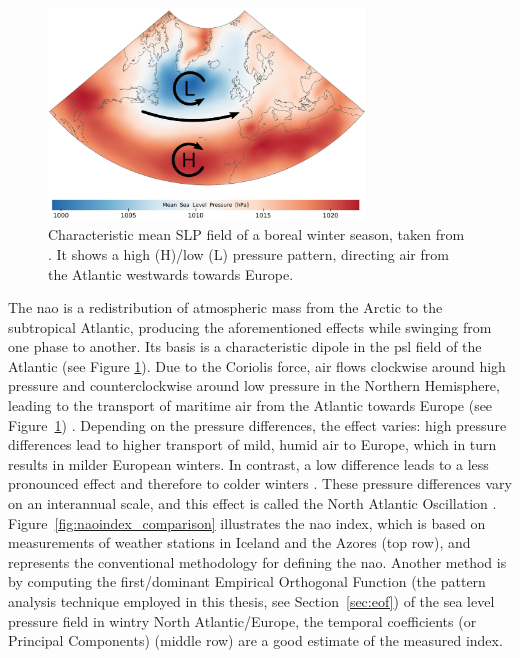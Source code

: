 \begin{figure}[htb]
  \begin{center}
    \includegraphics[width=0.75\textwidth]{figures/nao_pattern_diss.png}
  \end{center}
  \caption[Sea Level Pressure Pattern North Atlantic]{Characteristic mean SLP field of a boreal winter season, taken from \cite{vietinghoffdiss}. It shows a high (H)/low (L) pressure pattern, directing air from the Atlantic westwards towards Europe. }
  \label{fig:naopattern}
\end{figure}


The \ac{nao} is a redistribution of atmospheric mass from the Arctic to the subtropical Atlantic, producing the aforementioned effects while swinging from one phase to another. 
Its basis is a characteristic dipole in the \ac{psl} field of the Atlantic (see Figure \ref{fig:naopattern}).
Due to the Coriolis force, air flows clockwise around high pressure and counterclockwise around low pressure in the Northern Hemisphere, leading to the transport of maritime air from the Atlantic towards Europe (see Figure~\ref{fig:naopattern}) \cite{hurrell_overview_2003, vietinghoffdiss}. 
Depending on the pressure differences, the effect varies: high pressure differences lead to higher transport of mild, humid air to Europe, which in turn results in milder European winters. In contrast, a low difference leads to a less pronounced effect and therefore to colder winters \cite{vietinghoffdiss}. 
These pressure differences vary on an interannual scale, and this effect is called the North Atlantic Oscillation \cite{hurrell_overview_2003}.  
Figure~\ref{fig:naoindex_comparison} illustrates the \ac{nao} index, which is based on measurements of weather stations in Iceland and the Azores (top row), and represents the conventional methodology for defining the \ac{nao}. 
Another method is by computing the first/dominant Empirical Orthogonal Function (the pattern analysis technique employed in this thesis, see Section~\ref{sec:eof}) of the sea level pressure field in wintry North Atlantic/Europe, the temporal coefficients (or Principal Components) (middle row) are a good estimate of the measured index. 

